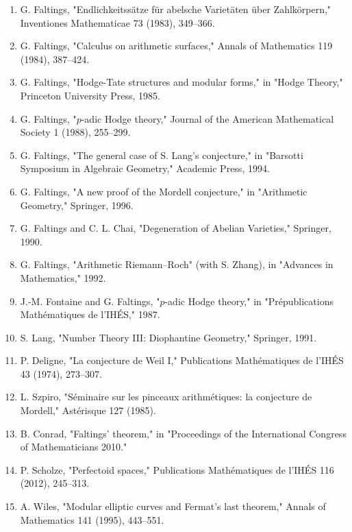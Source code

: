 \begin{enumerate}
\item G. Faltings, "Endlichkeitss\"atze f\"ur abelsche Variet\"aten \"uber Zahlk\"orpern," Inventiones Mathematicae 73 (1983), 349--366.
\item G. Faltings, "Calculus on arithmetic surfaces," Annals of Mathematics 119 (1984), 387--424.
\item G. Faltings, "Hodge-Tate structures and modular forms," in "Hodge Theory," Princeton University Press, 1985.
\item G. Faltings, "$p$-adic Hodge theory," Journal of the American Mathematical Society 1 (1988), 255--299.
\item G. Faltings, "The general case of S. Lang's conjecture," in "Barsotti Symposium in Algebraic Geometry," Academic Press, 1994.
\item G. Faltings, "A new proof of the Mordell conjecture," in "Arithmetic Geometry," Springer, 1996.
\item G. Faltings and C. L. Chai, "Degeneration of Abelian Varieties," Springer, 1990.
\item G. Faltings, "Arithmetic Riemann--Roch" (with S. Zhang), in "Advances in Mathematics," 1992.
\item J.-M. Fontaine and G. Faltings, "$p$-adic Hodge theory," in "Pr\'epublications Math\'ematiques de l'IH\'ES," 1987.
\item S. Lang, "Number Theory III: Diophantine Geometry," Springer, 1991.
\item P. Deligne, "La conjecture de Weil I," Publications Math\'ematiques de l'IH\'ES 43 (1974), 273--307.
\item L. Szpiro, "S\'eminaire sur les pinceaux arithm\'etiques: la conjecture de Mordell," Ast\'erisque 127 (1985).
\item B. Conrad, "Faltings' theorem," in "Proceedings of the International Congress of Mathematicians 2010."
\item P. Scholze, "Perfectoid spaces," Publications Math\'ematiques de l'IH\'ES 116 (2012), 245--313.
\item A. Wiles, "Modular elliptic curves and Fermat's last theorem," Annals of Mathematics 141 (1995), 443--551.
\end{enumerate}

